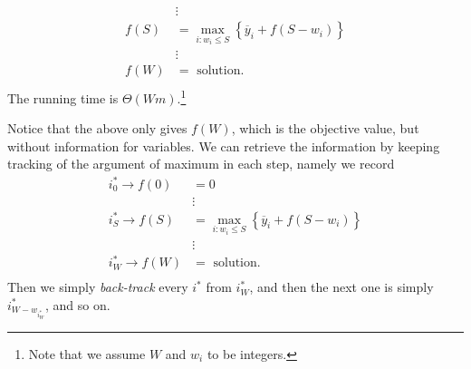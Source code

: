 \begin{answer}
\begin{itemize}
\[\begin{split}
				           & \vdots                                                                      \\
				      f(S) & = \max_{i\colon w_{i}\leq S}\left\{ \overline{y}_{i} + f(S - w_{i})\right\} \\
				           & \vdots                                                                      \\
				      f(W) & = \text{ solution}.                                                         \\
			      \end{split}
		      \]
		      The running time is \(\Theta(Wm)\).\footnote{Note that we assume \(W\) and \(w_{i}\) to be integers.}

		      Notice that the above only gives \(f(W)\), which is the objective value, but without information for variables. We can retrieve the information by keeping tracking of the argument of maximum in each step, namely we record
		      \[
			      \begin{split}
				      i^{\ast}_{0 }\to f(0) & = 0                                                                         \\
				                            & \vdots                                                                      \\
				      i^{\ast}_S \to f(S)   & = \max_{i\colon w_{i}\leq S}\left\{ \overline{y}_{i} + f(S - w_{i})\right\} \\
				                            & \vdots                                                                      \\
				      i^{\ast}_W \to f(W)   & = \text{ solution}.                                                         \\
			      \end{split}
		      \]
		      Then we simply \emph{back-track} every \(i^{\ast}\) from \(i^{\ast}_W\), and then the next one is simply \(i^{\ast}_{W - w_{i^{\ast}_W}}\), and so on.
	\end{itemize}
\end{answer}